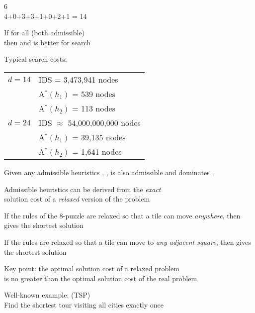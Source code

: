 \documentclass{article}
\begin{document}
\begin{huge}
 6\\
 4+0+3+3+1+0+2+1 = {14}





If  for all  (both admissible)\\
then    and is better for search

Typical search costs:

\begin{tabular}{ll}
$d=14$ & IDS = 3,473,941 nodes \\
       & A$^*(h_1)$ = 539 nodes \\
       & A$^*(h_2)$ = 113 nodes \\
$d=24$ & IDS $\approx$ 54,000,000,000 nodes \\
       & A$^*(h_1)$ = 39,135 nodes \\
       & A$^*(h_2)$ = 1,641 nodes 
\end{tabular}

Given any admissible heuristics , ,
\mat{\[
  h(n) = \max(h_a(n),h_b(n))
\]}
is also admissible and dominates , 





Admissible heuristics can be derived from the \emph{exact}\\
solution cost of a \emph{relaxed} version of the problem

If the rules of the 8-puzzle are relaxed so that a tile can move
\emph{anywhere}, then  gives the shortest solution

If the rules are relaxed so that a tile can move to \emph{any adjacent
square}, then  gives the shortest solution

Key point: the optimal solution cost of a relaxed problem \\
is no greater than the optimal solution cost of the real problem


Well-known example:  (TSP)\\
Find the shortest tour visiting all cities exactly once


\end{huge}
\end{document}
